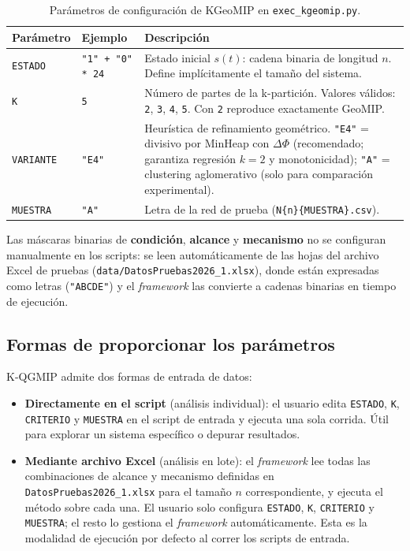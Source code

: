 \begin{table}[H]
\centering
\begin{tabular}{|l|p{3.5cm}|p{6cm}|}
\hline
\textbf{Parámetro} & \textbf{Ejemplo} & \textbf{Descripción} \\
\hline
\texttt{ESTADO} & \texttt{"1" + "0" * 24} &
  Estado inicial $s(t)$: cadena binaria de longitud $n$.
  Define implícitamente el tamaño del sistema. \\
\hline
\texttt{K} & \texttt{5} &
  Número de partes de la k-partición. Valores válidos: \texttt{2}, \texttt{3},
  \texttt{4}, \texttt{5}. Con \texttt{2} reproduce exactamente GeoMIP. \\
\hline
\texttt{VARIANTE} & \texttt{"E4"} &
  Heurística de refinamiento geométrico.
  \texttt{"E4"} = divisivo por MinHeap con $\Delta\Phi$ (recomendado; garantiza
  regresión $k=2$ y monotonicidad);
  \texttt{"A"} = clustering aglomerativo (solo para comparación experimental). \\
\hline
\texttt{MUESTRA} & \texttt{"A"} &
  Letra de la red de prueba (\texttt{N\{n\}\{MUESTRA\}.csv}). \\
\hline
\end{tabular}
\caption{Parámetros de configuración de KGeoMIP en \texttt{exec\_kgeomip.py}.}
\label{tab:params_kgeomip_5}
\end{table}

Las máscaras binarias de \textbf{condición}, \textbf{alcance} y \textbf{mecanismo}
no se configuran manualmente en los scripts: se leen automáticamente de las
hojas del archivo Excel de pruebas (\texttt{data/DatosPruebas2026\_1.xlsx}),
donde están expresadas como letras (\texttt{"ABCDE"}) y el \textit{framework}
las convierte a cadenas binarias en tiempo de ejecución.

\subsection{Formas de proporcionar los parámetros}

K-QGMIP admite dos formas de entrada de datos:

\begin{itemize}
  \item \textbf{Directamente en el script} (análisis individual): el usuario edita
        \texttt{ESTADO}, \texttt{K}, \texttt{CRITERIO} y \texttt{MUESTRA} en el script
        de entrada y ejecuta una sola corrida. Útil para explorar un sistema específico
        o depurar resultados.

  \item \textbf{Mediante archivo Excel} (análisis en lote): el \textit{framework}
        lee todas las combinaciones de alcance y mecanismo definidas en
        \texttt{DatosPruebas2026\_1.xlsx} para el tamaño $n$ correspondiente, y ejecuta
        el método sobre cada una. El usuario solo configura \texttt{ESTADO}, \texttt{K},
        \texttt{CRITERIO} y \texttt{MUESTRA}; el resto lo gestiona el \textit{framework}
        automáticamente. Esta es la modalidad de ejecución por defecto al correr los
        scripts de entrada.
\end{itemize}
